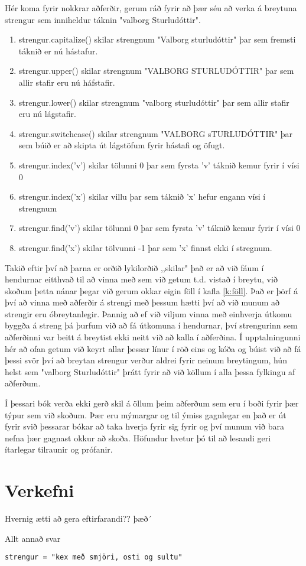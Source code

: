 Hér koma fyrir nokkrar aðferðir, gerum ráð fyrir að þær séu að verka á breytuna strengur sem inniheldur táknin "valborg Sturludóttir".
\vspace{5px}
\begin{enumerate}
	\item strengur.capitalize() skilar strengnum "Valborg sturludóttir" þar sem fremsti táknið er nú hástafur.
	\item strengur.upper() skilar strengnum "VALBORG STURLUDÓTTIR" þar sem allir stafir eru nú háfstafir.
	\item strengur.lower() skilar strengnum "valborg sturludóttir" þar sem allir stafir eru nú lágstafir.
	\item strengur.switchcase() skilar strengnum "VALBORG sTURLUDÓTTIR" þar sem búið er að skipta út lágstöfum fyrir hástafi og öfugt.
	\item strengur.index('v') skilar tölunni 0 þar sem fyrsta 'v' táknið kemur fyrir í vísi 0
	\item strengur.index('x') skilar villu þar sem táknið 'x' hefur engann vísi í strengnum
	\item strengur.find('v') skilar tölunni 0 þar sem fyrsta 'v' táknið kemur fyrir í vísi 0
	\item strengur.find('x') skilar tölvunni -1 þar sem 'x' finnst ekki í stregnum. 
\end{enumerate}
\vspace{10px}

Takið eftir því að þarna er orðið lykilorðið ,,skilar" það er að við fáum í hendurnar eitthvað til að vinna með sem við getum t.d. vistað í breytu, við skoðum þetta nánar þegar við gerum okkar eigin föll í kafla \ref{k:föll}.
Það er þörf á því að vinna með aðferðir á strengi með þessum hætti því að við munum að strengir eru óbreytanlegir.
Þannig að ef við viljum vinna með einhverja útkomu byggða á streng þá þurfum við að fá útkomuna í hendurnar, því strengurinn sem aðferðinni var beitt á breytist ekki neitt við að kalla í aðferðina.
Í upptalningunni hér að ofan getum við keyrt allar þessar línur í röð eins og kóða og búist við að fá þessi svör því að breytan strengur verður aldrei fyrir neinum breytingum, hún helst sem "valborg Sturludóttir" þrátt fyrir að við köllum í alla þessa fylkingu af aðferðum.

Í þessari bók verða ekki gerð skil á öllum þeim aðferðum sem eru í boði fyrir þær týpur sem við skoðum.
Þær eru mýmargar og til ýmiss gagnlegar en það er út fyrir svið þessarar bókar að taka hverja fyrir sig fyrir og því munum við bara nefna þær gagnast okkur að skoða.
Höfundur hvetur þó til að lesandi geri ítarlegar tilraunir og prófanir.

\section{Verkefni}
\begin{exercise}\label{str1}
	Hvernig ætti að gera eftirfarandi?? þæð´
\end{exercise}
\begin{Answer}[ref={str1}]
	Allt annað svar 
	\begin{lstlisting}[caption=Aðferðir kynntar, label=lst:lausnir-adferdir]
		strengur = "kex með smjöri, osti og sultu"
	\end{lstlisting}
\end{Answer}